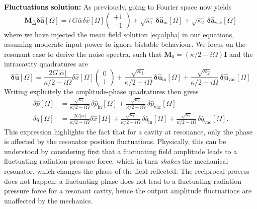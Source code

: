 \noindent \textbf{Fluctuations solution:} As previously, going to Fourier space now yields 
\begin{equation}
     \mathbf{M}_{\bar\Delta} \mathbf{\delta \hat{a}}[\Omega]  = i \,  G \bar{\alpha}_{\mathrm{}} \delta \hat{x}[\Omega]   \begin{pmatrix} +1 \\ -1\end{pmatrix}  +\sqrt{\kappa_{\mathrm{1}}} \, \mathbf{\delta \hat{a}_{\mathrm{in}}}[\Omega]  + \sqrt{\kappa_2} \, \mathbf{\delta \hat{a}_{\mathrm{vac}}}[\Omega] 
\end{equation}
where we have injected the mean field solution \eqref{eq:alpha} in our equations, assuming moderate input power to ignore bistable behaviour. We focus on the resonant case to derive the noise spectra, such that $\mathbf{M}_0 = (\kappa/2 - i\Omega) \mathbf{I}$  and the intracavity quadratures are
\begin{equation}
  \mathbf{\delta \hat{u}}[\Omega] =  \frac{2G|\bar \alpha|}{\kappa/2 - i\Omega}\delta \hat{x}[\Omega] \begin{pmatrix} 0\\ 1\end{pmatrix}  +\frac{\sqrt{\kappa_{\mathrm{1}}}}{\kappa/2 - i\Omega} \, \mathbf{\delta \hat{u}_{\mathrm{in}}}[\Omega]  +\frac{\sqrt{\kappa_{\mathrm{2}}}}{\kappa/2 - i\Omega} \, \mathbf{\delta \hat{u}_{\mathrm{vac}}}[\Omega]  
\end{equation}
Writing explicitely the amplitude-phase quadratures then gives 
\begin{equation}
  \begin{split}
    \delta \hat{p}[\Omega] &= \frac{\sqrt{\kappa_{\mathrm{1}}}}{\kappa/2 - i\Omega} \, \delta \hat{p}_{\mathrm{in}}[\Omega] + \frac{\sqrt{\kappa_{\mathrm{2}}}}{\kappa/2 - i\Omega} \, \delta \hat{p}_{\mathrm{vac}}[\Omega] \\
    \delta \hat{q}[\Omega] &=  \frac{2G|\bar \alpha|}{\kappa/2 - i\Omega}\delta \hat{x}[\Omega]  +\frac{\sqrt{\kappa_{\mathrm{1}}}}{\kappa/2 - i\Omega} \, \delta \hat{q}_{\mathrm{in}}[\Omega]  + \frac{\sqrt{\kappa_{\mathrm{2}}}}{\kappa/2 - i\Omega} \, \delta \hat{q}_{\mathrm{vac}}[\Omega] .
  \end{split}
   \label{eq:intra_quad}
\end{equation}
This expression highlights the fact that for a cavity at resonance, only the phase is affected by the resonator position fluctuations. Physically, this can be understood by considering first that a fluctuating field amplitude leads to a fluctuating radiation-pressure force, which in turn \textit{shakes} the mechanical resonator, which changes the phase of the field reflected. The reciprocal process does not happen: a fluctuating phase does not lead to a fluctuating radiation pressure force for a resonant cavity, hence the output amplitude fluctuations are unaffected by the mechanics. \\

